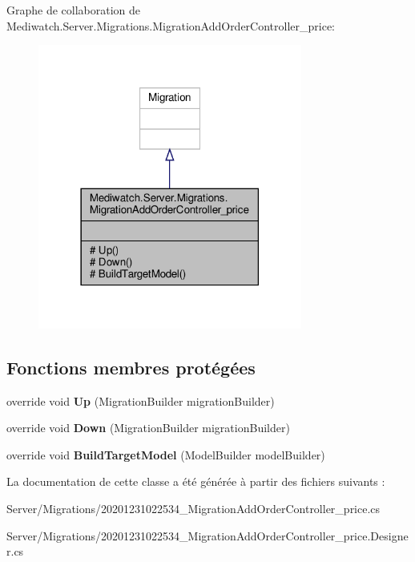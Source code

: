 Graphe de collaboration de Mediwatch.\+Server.\+Migrations.\+Migration\+Add\+Order\+Controller\+\_\+price\+:\nopagebreak
\begin{figure}[H]
\begin{center}
\leavevmode
\includegraphics[width=246pt]{class_mediwatch_1_1_server_1_1_migrations_1_1_migration_add_order_controller__price__coll__graph}
\end{center}
\end{figure}
\subsection*{Fonctions membres protégées}
\begin{DoxyCompactItemize}
\item 
\mbox{\label{class_mediwatch_1_1_server_1_1_migrations_1_1_migration_add_order_controller__price_a2e7a36d52cd9d920e4793c21bfa5cfc2}} 
override void {\bfseries Up} (Migration\+Builder migration\+Builder)
\item 
\mbox{\label{class_mediwatch_1_1_server_1_1_migrations_1_1_migration_add_order_controller__price_aa97cef104279dc1e12f5494092fb40b5}} 
override void {\bfseries Down} (Migration\+Builder migration\+Builder)
\item 
\mbox{\label{class_mediwatch_1_1_server_1_1_migrations_1_1_migration_add_order_controller__price_afe9cdddc6bcca8640db6e8794e482c0c}} 
override void {\bfseries Build\+Target\+Model} (Model\+Builder model\+Builder)
\end{DoxyCompactItemize}


La documentation de cette classe a été générée à partir des fichiers suivants \+:\begin{DoxyCompactItemize}
\item 
Server/\+Migrations/20201231022534\+\_\+\+Migration\+Add\+Order\+Controller\+\_\+price.\+cs\item 
Server/\+Migrations/20201231022534\+\_\+\+Migration\+Add\+Order\+Controller\+\_\+price.\+Designer.\+cs\end{DoxyCompactItemize}
